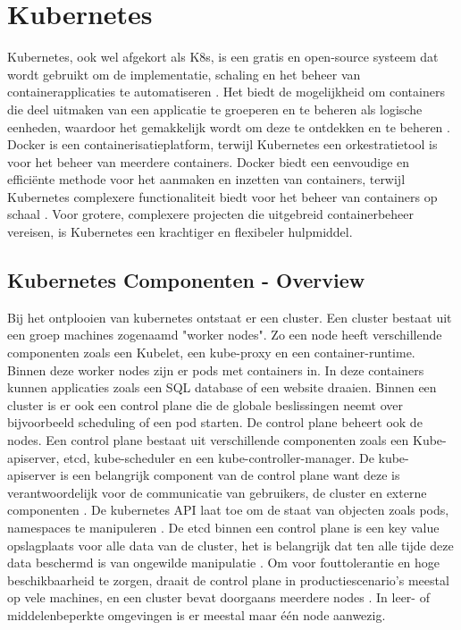 \section{Kubernetes}
Kubernetes, ook wel afgekort als K8s, is een gratis en open-source systeem dat wordt gebruikt om de implementatie, schaling en het beheer van containerapplicaties te automatiseren \autocite{KubernetesDocs-2023}. 
Het biedt de mogelijkheid om containers die deel uitmaken van een applicatie te groeperen en te beheren als logische eenheden, waardoor het gemakkelijk wordt om deze te ontdekken en te beheren \autocite{KubernetesDocs-2023}.
Docker is een containerisatieplatform, terwijl Kubernetes een orkestratietool is voor het beheer van meerdere containers.
Docker biedt een eenvoudige en efficiënte methode voor het aanmaken en inzetten van containers, terwijl Kubernetes complexere functionaliteit biedt voor het beheer van containers op schaal \autocite{banerjee-2023}.
Voor grotere, complexere projecten die uitgebreid containerbeheer vereisen, is Kubernetes een krachtiger en flexibeler hulpmiddel.

\subsection{Kubernetes Componenten - Overview}
\autocite{KubernetesDocs-2023} Bij het ontplooien van kubernetes ontstaat er een cluster. Een cluster bestaat uit een groep machines zogenaamd "worker nodes". Zo een node heeft verschillende componenten zoals een Kubelet, een kube-proxy en een container-runtime.
Binnen deze worker nodes zijn er pods met containers in. In deze containers kunnen applicaties zoals een SQL database of een website draaien. 
\autocite{KubernetesDocs-2023} Binnen een cluster is er ook een control plane die de globale beslissingen neemt over bijvoorbeeld scheduling of een pod starten. De control plane beheert ook de nodes. 
\autocite{KubernetesDocs-2023} Een control plane bestaat uit verschillende componenten zoals een Kube-apiserver, etcd, kube-scheduler en een kube-controller-manager. 
De kube-apiserver is een belangrijk component van de control plane want deze is verantwoordelijk voor de communicatie van gebruikers, de cluster en externe componenten \autocite{hohn-2020}. 
De kubernetes API laat toe om de staat van objecten zoals pods, namespaces te manipuleren \autocite{KubernetesDocs-2023}.
De etcd binnen een control plane is een key value opslagplaats voor alle data van de cluster, het is belangrijk dat ten alle tijde deze data beschermd is van ongewilde manipulatie \autocite{KubernetesDocs-2023}. 
Om voor fouttolerantie en hoge beschikbaarheid te zorgen, draait de control plane in productiescenario's meestal op vele machines, en een cluster bevat doorgaans meerdere nodes \autocite{KubernetesDocs-2023}. 
In leer- of middelenbeperkte omgevingen is er meestal maar één node aanwezig.

